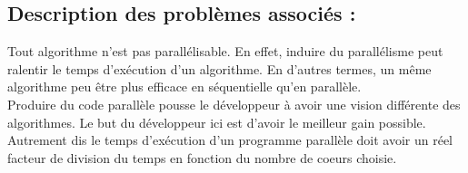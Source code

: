 	\subsection*{Description des problèmes associés :}
		Tout algorithme n'est pas parallélisable. En effet, induire du parallélisme peut ralentir le temps d'exécution d'un algorithme. En d'autres termes, un même algorithme peu être plus efficace en séquentielle qu'en parallèle.\\

		Produire du code parallèle pousse le développeur à avoir une vision différente des algorithmes. Le but du développeur ici est d'avoir le meilleur gain possible. Autrement dis le temps d'exécution d'un programme parallèle doit avoir un réel facteur de division du temps en fonction du nombre de coeurs choisie.
